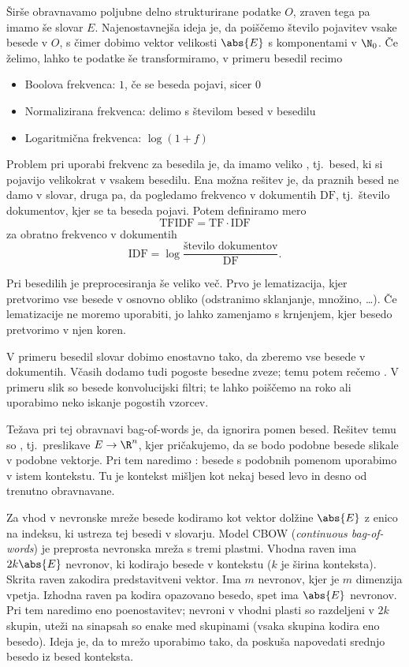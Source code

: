 
Širše obravnavamo poljubne delno strukturirane podatke $O$, zraven tega pa imamo
še slovar $E$.
Najenostavnejša ideja je, da poiščemo število pojavitev vsake besede v $O$, s
čimer dobimo vektor velikosti $\abs{E}$ s komponentami v $\N_0$.
Če želimo, lahko te podatke še transformiramo, v primeru besedil recimo
\begin{itemize}
\item Boolova frekvenca: $1$, če se beseda pojavi, sicer $0$
\item Normalizirana frekvenca: delimo s številom besed v besedilu
\item Logaritmična frekvenca: $\log(1 + f)$
\end{itemize}
Problem pri uporabi frekvenc za besedila je, da imamo veliko , tj.~besed, ki si pojavijo velikokrat v vsakem besedilu.
Ena možna rešitev je, da praznih besed ne damo v slovar, druga pa, da pogledamo
frekvenco v dokumentih $\text{DF}$, tj.~število dokumentov, kjer se ta
beseda pojavi.
Potem definiramo mero
\[
  \text{TFIDF} = \text{TF} \cdot \text{IDF}
\]
za obratno frekvenco v dokumentih
\[
  \text{IDF} = \log \frac{\text{število dokumentov}}{\text{DF}}.
\]


Pri besedilih je preprocesiranja še veliko več.
Prvo je lematizacija, kjer pretvorimo vse besede v osnovno obliko (odstranimo
sklanjanje, množino, \ldots).
Če lematizacije ne moremo uporabiti, jo lahko zamenjamo s krnjenjem, kjer besedo
pretvorimo v njen koren.


V primeru besedil slovar dobimo enostavno tako, da zberemo vse besede v
dokumentih.
Včasih dodamo tudi pogoste besedne zveze; temu potem rečemo .
V primeru slik so besede konvolucijski filtri; te lahko poiščemo na roko ali
uporabimo neko iskanje pogostih vzorcev.

Težava pri tej obravnavi bag-of-words je, da ignorira pomen besed.
Rešitev temu so , tj.~preslikave $E \to \R^n$, kjer pričakujemo,
da se bodo podobne besede slikale v podobne vektorje.
Pri tem naredimo : besede s podobnih pomenom
uporabimo v istem kontekstu.
Tu je kontekst mišljen kot nekaj besed levo in desno od trenutno obravnavane.

Za vhod v nevronske mreže besede kodiramo kot vektor dolžine $\abs{E}$ z enico
na indeksu, ki ustreza tej besedi v slovarju.
Model CBOW (\textit{continuous bag-of-words}) je preprosta nevronska mreža s
tremi plastmi.
Vhodna raven ima $2 k \abs{E}$ nevronov, ki kodirajo besede v kontekstu ($k$ je
širina konteksta).
Skrita raven zakodira predstavitveni vektor.
Ima $m$ nevronov, kjer je $m$ dimenzija vpetja.
Izhodna raven pa kodira opazovano besedo, spet ima $\abs{E}$ nevronov.
Pri tem naredimo eno poenostavitev; nevroni v vhodni plasti so razdeljeni v
$2k$ skupin, uteži na sinapsah so enake med skupinami (vsaka skupina kodira eno
besedo).
Ideja je, da to mrežo uporabimo tako, da poskuša napovedati srednjo besedo iz
besed konteksta.

